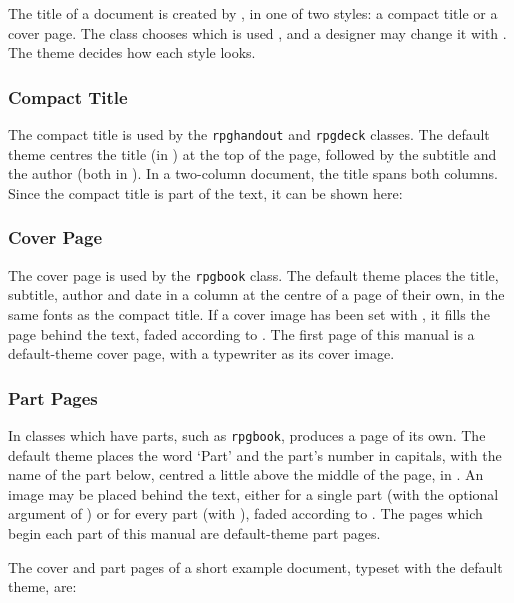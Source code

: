 			The title of a document is created by , in one of two styles: a compact title or a cover page. The class chooses which is used , and a designer may change it with . The theme decides how each style looks.

			\subsubsection{Compact Title}

				The compact title is used by the \texttt{rpghandout} and \texttt{rpgdeck} classes. The default theme centres the title (in ) at the top of the page, followed by the subtitle and the author (both in ). In a two-column document, the title spans both columns. Since the compact title is part of the text, it can be shown here:


			\subsubsection{Cover Page}

				The cover page is used by the \texttt{rpgbook} class. The default theme places the title, subtitle, author and date in a column at the centre of a page of their own, in the same fonts as the compact title. If a cover image has been set with , it fills the page behind the text, faded according to . The first page of this manual is a default-theme cover page, with a typewriter as its cover image.

			\subsubsection{Part Pages}

				In classes which have parts, such as \texttt{rpgbook},  produces a page of its own. The default theme places the word `Part' and the part's number in capitals, with the name of the part below, centred a little above the middle of the page, in . An image may be placed behind the text, either for a single part (with the optional argument of ) or for every part (with ), faded according to . The pages which begin each part of this manual are default-theme part pages.

				The cover and part pages of a short example document, typeset with the default theme, are:

